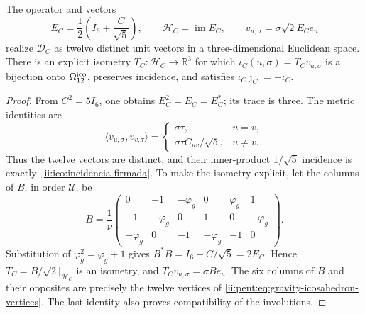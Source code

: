 \begin{samepage}
\begin{proposition}
\label{ii:ico:realizacion-firmada}
The operator and vectors
\begin{equation}
 E_C=\frac12\left(I_6+\frac C{\sqrt5}\right),\qquad
 \mathcal H_C=\operatorname{im}E_C,\qquad
 v_{u,\sigma}=\sigma\sqrt2 E_Ce_u
 \label{ii:ico:proyector-seis}
\end{equation}
realize \(\mathcal D_C\) as twelve distinct unit vectors in a
three-dimensional Euclidean space. There is an explicit isometry
\(T_C:\mathcal H_C\to\mathbb R^3\) for which
\(\iota_C(u,\sigma)=T_Cv_{u,\sigma}\) is a bijection onto
\(\Omega_{12}^{\rm ico}\), preserves incidence, and satisfies
\(\iota_C\jmath_C=-\iota_C\).
\end{proposition}
\end{samepage}
\begin{proof}
From \(C^2=5I_6\), one obtains \(E_C^2=E_C=E_C^*\); its trace is three.
The metric identities are
\[
 \langle v_{u,\sigma},v_{v,\tau}\rangle
 =\begin{cases}\sigma\tau,&u=v,\\
 \sigma\tau C_{uv}/\sqrt5,&u\ne v.
 \end{cases}
\]
Thus the twelve vectors are distinct, and their inner-product
\(1/\sqrt5\) incidence is exactly~\eqref{ii:ico:incidencia-firmada}.
To make the isometry explicit, let the columns of \(B\), in order
\(\mathcal U\), be
\[
 B=\frac1\nu
 \begin{pmatrix}
 0&-1&-\varphi_g&0&\varphi_g&1\\
 -1&-\varphi_g&0&1&0&-\varphi_g\\
 -\varphi_g&0&-1&-\varphi_g&-1&0
 \end{pmatrix}.
\]
Substitution of \(\varphi_g^2=\varphi_g+1\) gives
\(B^*B=I_6+C/\sqrt5=2E_C\). Hence
\(T_C=B/\sqrt2\big|_{\mathcal H_C}\) is an isometry, and
\(T_Cv_{u,\sigma}=\sigma Be_u\). The six columns of \(B\) and their
opposites are precisely the twelve vertices of
\eqref{ii:pent:eq:gravity-icosahedron-vertices}. The last identity
also proves compatibility of the involutions.
\end{proof}

